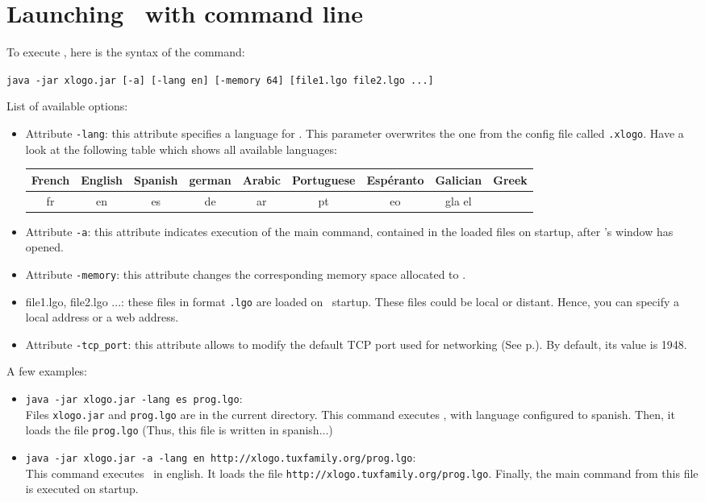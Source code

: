 \chapter{Launching \xlogo\ with command line}
\noindent
To execute \xlogo, here is the syntax of the command:
\begin{center}
 \texttt{java -jar xlogo.jar [-a] [-lang en] [-memory 64] [file1.lgo file2.lgo ...] } 
\end{center}
List of available options: \\
\begin{itemize}
 \item Attribute \texttt{-lang}: this attribute specifies a language for \xlogo. This parameter overwrites the one from the config file called  \texttt{.xlogo}. Have a look at the following table which shows all available languages: \\
\begin{center}
\begin{tabular}{|c|c|c|c|c|c|c|c|c|}
\hline
French & English & Spanish & german & Arabic & Portuguese & Espéranto & Galician & Greek\\
\hline
fr & en & es & de & ar & pt & eo & gla el\\
\hline
\end{tabular}
\end{center}
\vspace{0.5cm}
\item Attribute \texttt{-a}: this attribute indicates execution of the main command, contained in the loaded files on startup, after \xlogo's window has opened.\\
\item Attribute \texttt{-memory}: this attribute changes the corresponding memory space allocated to \xlogo.\\
\item file1.lgo, file2.lgo ...: these files in format \texttt{.lgo} are loaded on \xlogo\ startup. These files could be local or distant. Hence, you can specify a local address or a web address.\\
\item Attribute \texttt{-tcp\_port}: this attribute allows to modify the default TCP port used for networking (See p.\pageref{network}). By default, its value is 1948.
\end{itemize}
\vspace{0.5cm}
A few examples: 
\begin{itemize}
 \item \texttt{java -jar xlogo.jar -lang es prog.lgo}:\\
 Files \texttt{xlogo.jar} and \texttt{prog.lgo} are in the current directory. This command executes \xlogo, with language configured to spanish. Then, it loads the file \texttt{prog.lgo} (Thus, this file is written in spanish...)\\
 \item \texttt{java -jar xlogo.jar -a -lang en http://xlogo.tuxfamily.org/prog.lgo}:\\
 This command executes \xlogo\ in english. It loads the file \texttt{http://xlogo.tuxfamily.org/prog.lgo}. Finally, the main command from this file is executed on startup.\\
\end{itemize}